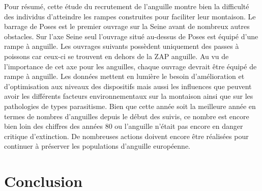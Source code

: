 \documentclass[11pt,titlepage,twoside]{article}\usepackage[]{graphicx}\usepackage[table]{xcolor}
\begin{document}
\vspace{0.5cm}
Pour résumé, cette étude du recrutement de l’anguille montre bien la difficulté des individus d’atteindre les rampes construites pour faciliter leur montaison. Le barrage de Poses est le premier ouvrage sur la Seine avant de nombreux autres obstacles. Sur l’axe Seine seul l’ouvrage situé au-dessus de Poses est équipé d’une rampe à anguille. Les ouvrages suivants possèdent uniquement des passes à poissons car ceux-ci se trouvent en dehors de la ZAP anguille. Au vu de l’importance de cet axe pour les anguilles, chaque ouvrage devrait être équipé de rampe à anguille. Les données mettent en lumière le besoin d’amélioration et d’optimisation aux niveaux des dispositifs mais aussi les influences que peuvent avoir les différents facteurs environnementaux sur la montaison ainsi que sur les pathologies de types parasitisme. Bien que cette année soit la meilleure année en termes de nombres d’anguilles depuis le début des suivis, ce nombre est encore bien loin des chiffres des années 80 ou l’anguille n’était pas encore en danger critique d’extinction. De nombreuses actions doivent encore être réalisées pour continuer à préserver les populations d'anguille européenne.

\section{Conclusion}
\end{document}
